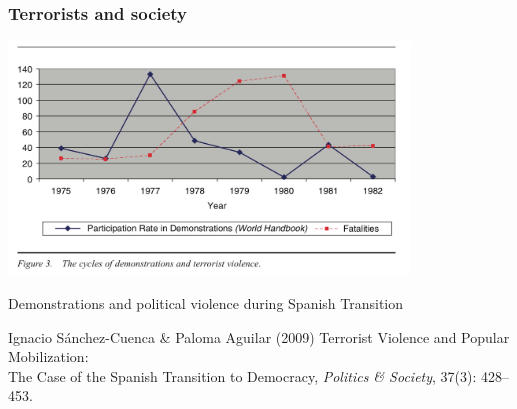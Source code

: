 \documentclass[aspectratio=43]{beamer}
\begin{document}
\begin{frame}
\frametitle{Terrorists and society}
\centering

\includegraphics[width = 0.8\textwidth]{img/sanchez-cuenca-aguilar}

{\small Demonstrations and political violence during Spanish Transition}

\vspace{15pt}

{\tiny Ignacio Sánchez-Cuenca \& Paloma Aguilar (2009) Terrorist Violence and Popular Mobilization:\\The Case of the Spanish Transition to Democracy, \textit{Politics \& Society}, 37(3): 428--453.\\}

\end{frame}
\end{document}
